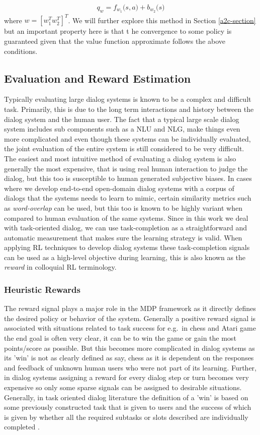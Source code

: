 \documentclass[12pt]{extarticle}
\numberwithin{equation}{section}
\begin{document}
	\begin{align}
	q_w = f_{w_1}\big(s,a\big) + b_{w_2}\big(s\big)
	\end{align}
	where $w = [w_1^T w_2^T]^T$. We will further explore this method in Section \ref{a2c-section} but an important property here is that t he convergence to some policy is guaranteed given that the value function approximate follows the above conditions.
	\subsection{Evaluation and Reward Estimation}
	Typically evaluating large dialog systems is known to be a complex and difficult task. Primarily, this is due to the long term interactions and history between the dialog system and the human user. The fact that a typical large scale dialog system includes sub components such as a NLU and NLG, make things even more complicated and even though these systems can be individually evaluated, the joint evaluation of the entire system is still considered to be very difficult. The easiest and most intuitive method of evaluating a dialog system is also generally the most expensive, that is using real human interaction to judge the dialog, but this too is susceptible to human generated subjective biases. In cases where we develop end-to-end open-domain dialog systems with a corpus of dialogs that the systems needs to learn to mimic, certain similarity metrics such as \textit{word-overlap} can be used\cite{bordes2016learning}, but this too is known to be highly variant when compared to human evaluation of the same systems\cite{liu2016not}. Since in this work we deal with task-oriented dialog, we can use task-completion as a straightforward and automatic measurement that makes sure the learning strategy is valid. When applying RL techniques to develop dialog systems these task-completion signals can be used as a high-level objective during learning, this is also known as the \textit{reward} in colloquial RL terminology.
	\subsubsection{Heuristic Rewards}
	The reward signal plays a major role in the MDP framework as it directly defines the desired policy or behavior of the system. Generally a positive reward signal is associated with situations related to task success for e.g.\ in chess and Atari game the end goal is often very clear,  it can be to win the game or gain the most points/score as possible. But this  becomes more complicated in dialog systems as its 'win' is not as clearly defined as say, chess as it is dependent on the responses and feedback of unknown human users who were not part of its learning. Further, in dialog systems assigning a reward for every dialog step or turn becomes very expensive so only some sparse signals can be assigned to desirable situations. Generally, in task oriented dialog literature the definition of a 'win' is based on some previously constructed task that is given to users and the success of which is given by whether all the required subtasks or slots described are individually completed \cite{Williams:2007:POM:1221595.1221967}\cite{DBLP:journals/corr/abs-1711-01731}\cite{lemon2006evaluating}.
\end{document}
